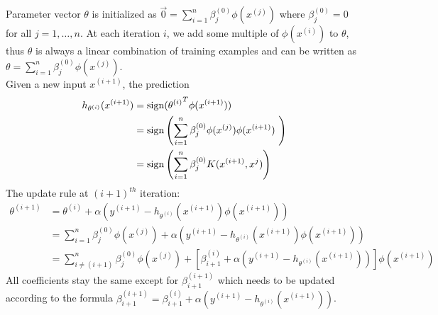 \begin{answer}
Parameter vector $\theta$ is initialized as $\vec{0} = \sum_{i=1}^{n}\beta_j^{(0)} \phi(x^{(j)})$ where $\beta_j^{(0)} = 0$ for all $j=1,\dots,n$. At each iteration $i$, we add some multiple of $\phi(x^{(i)})$ to $\theta$, thus $\theta$ is always a linear combination of training examples and can be written as $\theta = \sum_{i=1}^{n}\beta_j^{(0)} \phi(x^{(j)})$. \\
Given a new input $x^{(i+1)}$, the prediction
\begin{align}
	h_{\theta^{(i)}}(x^{(i+1)}) 
	&= \operatorname{sign}({\theta^{(i)}}^T \phi(x^{(i+1)})) \\
	&= \operatorname{sign} \left( \sum \limits_{i=1}^{n} \beta_j^{(0)} \phi(x^{(j)}) \phi(x^{(i+1)})\ \right) \\
	&= \operatorname{sign} \left( \sum \limits_{i=1}^{n} \beta_j^{(0)} K(x^{(i+1)},x^j) \right)
\end{align}
The update rule at $(i+1)^{th}$ iteration:
\begin{align}
	\theta^{(i+1)} 
	&= \theta^{(i)} + \alpha \left( y^{(i+1)} - h_{\theta^{(i)}}(x^{(i+1)}) \phi(x^{(i+1)}) \right) \\
	&= \sum_{i=1}^{n}\beta_j^{(0)} \phi(x^{(j)}) + \alpha \left( y^{(i+1)} - h_{\theta^{(i)}}(x^{(i+1)}) \phi(x^{(i+1)}) \right) \\
	&= \sum_{i\ne (i+1)}^{n}\beta_j^{(0)} \phi(x^{(j)}) + \left[ \beta_{i+1}^{(i)} + \alpha \left( y^{(i+1)} - h_{\theta^{(i)}}(x^{(i+1)}) \right) \right] \phi(x^{(i+1)}) 
\end{align}
All coefficients stay the same except for $\beta_{i+1}^{(i+1)}$ which needs to be updated according to the formula $\beta_{i+1}^{(i+1)} = \beta_{i+1}^{(i)} + \alpha \left( y^{(i+1)} - h_{\theta^{(i)}}(x^{(i+1)}) \right)$. \\
\end{answer}
